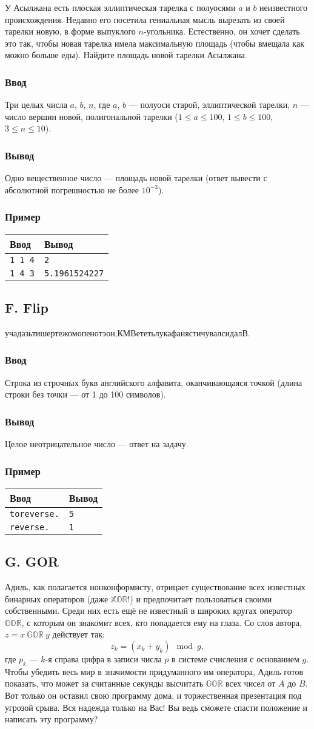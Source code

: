 \documentclass[10pt, a4paper]{article}
\newcommand{\informat}[1]
{
	\subsubsection*{Ввод} #1
}
\newcommand{\outformat}[1]
{
	\subsubsection*{Вывод} #1
}
\newcommand{\examplee}[4]
{
	\subsubsection*{Пример}
	\noindent
	\begin{center}
	\begin{tabularx}{\linewidth}{|X|X|}
	\hline
	Ввод 	& Вывод  	\\
	\hline
	{\tt #1} & {\tt #2}	\\
	\hline
	{\tt #3} & {\tt #4}	\\
	\hline
	\end{tabularx}
	\end{center}
}
\begin{document}
У Асылжана есть плоская эллиптическая тарелка с полуосями $a$ и $b$ неизвестного происхождения. Недавно его посетила гениальная мысль вырезать из своей тарелки новую, в форме выпуклого $n$-угольника. Естественно, он хочет сделать это так, чтобы новая тарелка имела максимальную площадь (чтобы вмещала как можно больше еды). Найдите площадь новой тарелки Асылжана.

\informat{Три целых числа $a$, $b$, $n$, где $a$, $b$ --- полуоси старой, эллиптической тарелки, $n$ --- число вершин новой, полигональной тарелки ($1 \le a \le 100$, $1 \le b \le 100$, $3 \le n \le 10$).}

\outformat{Одно вещественное число --- площадь новой тарелки (ответ вывести с абсолютной погрешностью не более $10^{-3}$).}

\examplee{1 1 4}{2}{1 4 3}{5.1961524227}



\subsection*{F. Flip}

учадазьтишертежомопенотэон,КМВететьлукафанястичувалсидалВ.

\informat{Строка из строчных букв английского алфавита, оканчивающаяся точкой (длина строки без точки --- от 1 до 100 символов).}

\outformat{Целое неотрицательное число --- ответ на задачу.}

\examplee{toreverse.}{5}{reverse.}{1}



\subsection*{G. GOR}

Адиль, как полагается нонконформисту, отрицает существование всех известных бинарных операторов (даже $\mathbb{XOR}$!) и предпочитает пользоваться своими собственными. Среди них есть ещё не известный в широких кругах оператор $\mathbb{GOR}$, с которым он знакомит всех, кто попадается ему на глаза. Со слов автора, $z = x \ \mathbb{GOR} \ y$ действует так:
$$z_k = (x_k + y_k) \mod g, $$ 
где $p_k$ --- $k$-я справа цифра в записи числа $p$ в системе счисления с основанием $g$. Чтобы убедить весь мир в значимости придуманного им оператора, Адиль готов показать, что может за считанные секунды высчитать $\mathbb{GOR}$ всех чисел от $A$ до $B$. Вот только он оставил свою программу дома, и торжественная презентация под угрозой срыва. Вся надежда только на Вас! Вы ведь сможете спасти положение и написать эту программу?
\end{document}
